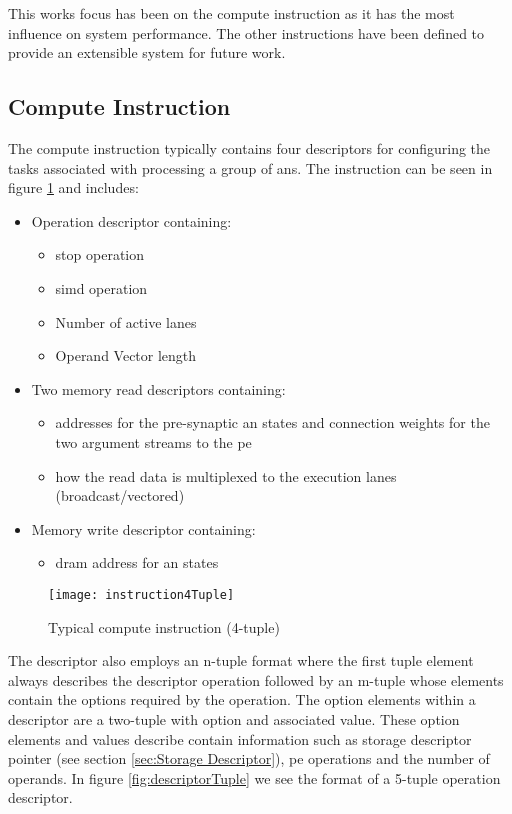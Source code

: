 This works focus has been on the compute instruction as it has the most influence on system performance.
The other instructions have been defined to provide an extensible system for future work.

\subsection{Compute Instruction}
\label{sec:Compute Instruction}

The compute instruction typically contains four descriptors for configuring the tasks associated with processing a group of \acp{an}.
The instruction can be seen in figure \ref{fig:Instruction (4-tuple example)} and includes: 
\begin{itemize}
  \item Operation descriptor containing:
    \begin{itemize}
      \item \ac{stop} operation
      \item \ac{simd} operation
      \item Number of active lanes
      \item Operand Vector length
    \end{itemize}
  \item Two memory read descriptors containing:
    \begin{itemize}
        \item addresses for the pre-synaptic \ac{an} states and connection weights for the two argument streams to the \ac{pe}
        \item how the read data is multiplexed to the execution lanes (broadcast/vectored)
    \end{itemize}
  \item Memory write descriptor containing:
    \begin{itemize}
      \item \ac{dram} address for \ac{an} states
    \end{itemize}
\end{itemize}

\begin{figure}[!t]
\centering
\captionsetup{justification=centering}
\captionsetup{width=.9\linewidth}
\centerline{
\mbox{\texttt{[image: instruction4Tuple]}}
}
\caption{Typical compute instruction (4-tuple)}
\label{fig:Instruction (4-tuple example)}
\end{figure}


The descriptor also employs an n-tuple format where the first tuple element always describes the descriptor operation followed by an m-tuple whose elements contain the options required by the operation.
The option elements within a descriptor are a two-tuple with option and associated value.
These option elements and values describe contain information such as storage descriptor pointer (see section \ref{sec:Storage Descriptor}), \ac{pe} operations and the number of operands.
In figure \ref{fig:descriptorTuple} we see the format of a 5-tuple operation descriptor.

